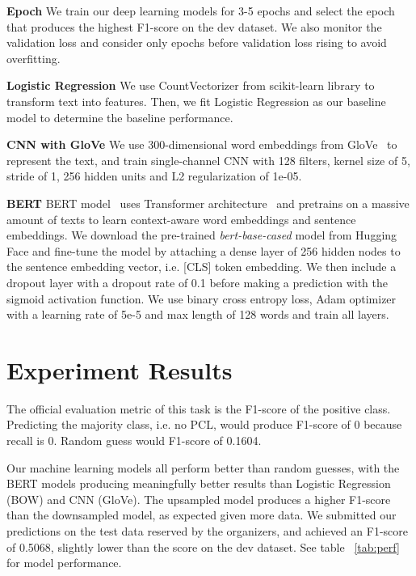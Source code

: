 \documentclass[11pt]{article}
\begin{document}
\textbf{Epoch} We train our deep learning models for 3-5 epochs and select the epoch that produces the highest F1-score on the dev dataset. We also monitor the validation loss and consider only epochs before validation loss rising to avoid overfitting.

\textbf{Logistic Regression}  We use CountVectorizer from scikit-learn library to transform text into features. Then, we fit Logistic Regression as our baseline model to determine the baseline performance. 

\textbf{CNN with GloVe}  We use 300-dimensional word embeddings from GloVe~\cite{pennington2014glove} to represent the text, and train single-channel CNN with 128 filters, kernel size of 5, stride of 1, 256 hidden units and L2 regularization of 1e-05. 

\textbf{BERT}  BERT model~\cite{devlin2018bert} uses Transformer architecture~\cite{vaswani2017attention} and pretrains on a massive amount of texts to learn context-aware word embeddings and sentence embeddings. We download the pre-trained \textit{bert-base-cased} model from Hugging Face and fine-tune the model by attaching a dense layer of 256 hidden nodes to the sentence embedding vector, i.e. [CLS] token embedding. We then include a dropout layer with a dropout rate of 0.1 before making a prediction with the sigmoid activation function. We use binary cross entropy loss, Adam optimizer with a learning rate of 5e-5 and max length of 128 words and train all layers.

\section{Experiment Results}

The official evaluation metric of this task is the F1-score of the positive class. Predicting the majority class, i.e. no PCL, would produce F1-score of 0 because recall is 0. Random guess would F1-score of 0.1604.

Our machine learning models all perform better than random guesses, with the BERT models producing meaningfully better results than Logistic Regression (BOW) and CNN (GloVe). The upsampled model produces a higher F1-score than the downsampled model, as expected given more data. We submitted our predictions on the test data reserved by the organizers, and achieved an F1-score of 0.5068, slightly lower than the score on the dev dataset. See table ~\ref{tab:perf} for model performance.
\end{document}
